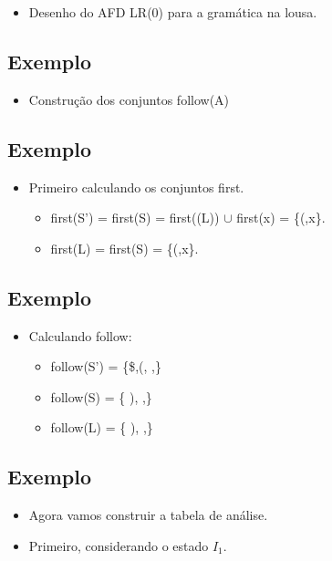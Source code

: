 \documentclass[11pt]{article}
\begin{document}
\begin{itemize}
\item Desenho do AFD LR(0) para a gramática na lousa.
\end{itemize}
\subsection*{Exemplo}
\label{sec:org73157a3}

\begin{itemize}
\item Construção dos conjuntos follow(A)
\end{itemize}
\subsection*{Exemplo}
\label{sec:org04483eb}

\begin{itemize}
\item Primeiro calculando os conjuntos first.
\begin{itemize}
\item first(S') = first(S) = first((L)) \(\cup\) first(x) = \{(,x\}.
\item first(L) = first(S) = \{(,x\}.
\end{itemize}
\end{itemize}
\subsection*{Exemplo}
\label{sec:org6e4b8c7}

\begin{itemize}
\item Calculando follow:
\begin{itemize}
\item follow(S') = \{\$,(, ,\}
\item follow(S) = \{ ), ,\}
\item follow(L) = \{ ), ,\}
\end{itemize}
\end{itemize}
\subsection*{Exemplo}
\label{sec:orgb0fd8b4}

\begin{itemize}
\item Agora vamos construir a tabela de análise.

\item Primeiro, considerando o estado \(I_1\).
\end{itemize}
\end{document}
